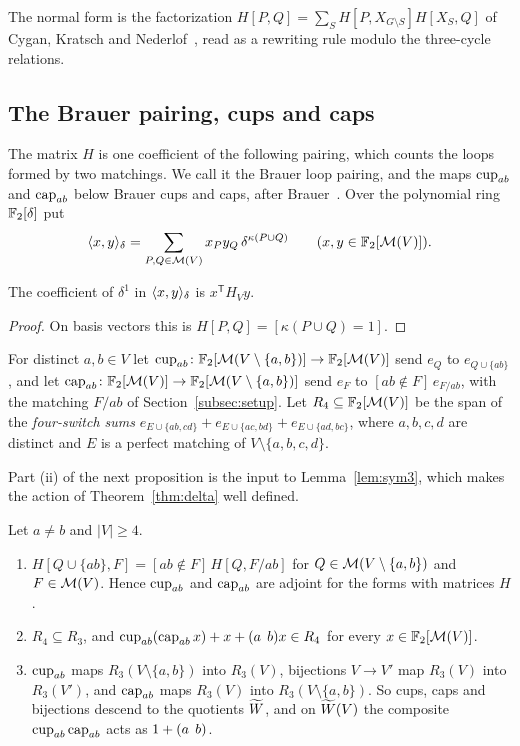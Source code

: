 The normal form is the factorization $H[P,Q]=\sum_S H[P,X_{G\setminus S}]H[X_S,Q]$ of Cygan, Kratsch and Nederlof~\cite[Thm.~3.4]{CKN18}, read as a rewriting rule modulo the three-cycle relations.

\subsection{The Brauer pairing, cups and caps}\label{subsec:brauer}

The matrix $H$ is one coefficient of the following pairing, which counts the loops formed by two matchings. We call it the Brauer loop pairing, and the maps $\operatorname{cup}_{ab}$ and $\operatorname{cap}_{ab}$ below Brauer cups and caps, after Brauer~\cite{Brauer37}. Over the polynomial ring $\mathbb{F}_2[\delta]$ put
\[
\langle x,y\rangle_\delta=\sum_{P,Q\in\mathcal{M}(V)}x_{P}y_Q\,\delta^{\kappa(P\cup Q)}\qquad(x,y\in\mathbb{F}_2[\mathcal{M}(V)]).
\]

\begin{proposition}\label{prop:brauer}
The coefficient of $\delta^1$ in $\langle x,y\rangle_\delta$ is $x^{\mathsf T}H_{V}y$.
\end{proposition}

\begin{proof}
On basis vectors this is $H[P,Q]=[\kappa(P\cup Q)=1]$.
\end{proof}

For distinct $a,b\in V$ let $\operatorname{cup}_{ab}\colon\mathbb{F}_2[\mathcal{M}(V\setminus\{a,b\})]\to\mathbb{F}_2[\mathcal{M}(V)]$ send $e_Q$ to $e_{Q\cup\{ab\}}$, and let $\operatorname{cap}_{ab}\colon\mathbb{F}_2[\mathcal{M}(V)]\to\mathbb{F}_2[\mathcal{M}(V\setminus\{a,b\})]$ send $e_F$ to $[ab\notin F]\,e_{F/ab}$, with the matching $F/ab$ of Section~\ref{subsec:setup}. Let $R_4\subseteq\mathbb{F}_2[\mathcal{M}(V)]$ be the span of the \emph{four-switch sums} $e_{E\cup\{ab,cd\}}+e_{E\cup\{ac,bd\}}+e_{E\cup\{ad,bc\}}$, where $a,b,c,d$ are distinct and $E$ is a perfect matching of $V\setminus\{a,b,c,d\}$.

Part (ii) of the next proposition is the input to Lemma~\ref{lem:sym3}, which makes the action of Theorem~\ref{thm:delta} well defined.

\begin{proposition}\label{prop:cupcap}
Let $a\ne b$ and $|V|\ge4$.
\begin{enumerate}
\item $H[Q\cup\{ab\},F]=[ab\notin F]\,H[Q,F/ab]$ for $Q\in\mathcal{M}(V\setminus\{a,b\})$ and $F\in\mathcal{M}(V)$. Hence $\operatorname{cup}_{ab}$ and $\operatorname{cap}_{ab}$ are adjoint for the forms with matrices $H$.
\item $R_4\subseteq R_3$, and $\operatorname{cup}_{ab}(\operatorname{cap}_{ab}x)+x+(a\;\,b)x\in R_4$ for every $x\in\mathbb{F}_2[\mathcal{M}(V)]$.
\item $\operatorname{cup}_{ab}$ maps $R_3(V\setminus\{a,b\})$ into $R_3(V)$, bijections $V\to V'$ map $R_3(V)$ into $R_3(V')$, and $\operatorname{cap}_{ab}$ maps $R_3(V)$ into $R_3(V\setminus\{a,b\})$. So cups, caps and bijections descend to the quotients $\widetilde{W}$, and on $\widetilde{W}(V)$ the composite $\operatorname{cup}_{ab}\operatorname{cap}_{ab}$ acts as $1+(a\;\,b)$.
\end{enumerate}
\end{proposition}

